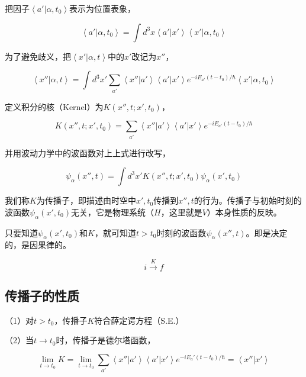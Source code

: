 把因子$\left\langle a' | \alpha, t_0 \right\rangle$表示为位置表象，

\begin{equation}
\left\langle a' | \alpha, t_0 \right\rangle = \int d^3 x \left\langle a' | x' \right\rangle \left\langle x' | \alpha, t_0 \right\rangle 
\end{equation}

为了避免歧义，把$\left\langle x' | \alpha, t \right\rangle$中的$x'$改记为$x''$，

\begin{equation}
\left\langle x'' | \alpha, t \right\rangle = \int d^3 x' \sum\limits_{a'}  \left\langle x'' | a' \right\rangle \left\langle a' | x' \right\rangle e^{- i E_{a'} (t - t_0) / \hbar} \left\langle x' | \alpha, t_0 \right\rangle
\end{equation}

定义积分的核（Kernel）为$K(x'', t; x', t_0)$，

\begin{equation}
K(x'', t; x', t_0) = \sum\limits_{a'}  \left\langle x'' | a' \right\rangle \left\langle a' | x' \right\rangle e^{- i E_{a'} (t - t_0) / \hbar}
\end{equation}

并用波动力学中的波函数对上上式进行改写，

\begin{equation}
\psi_\alpha (x'', t ) = \int d^3 x' K(x'', t; x', t_0) \psi_\alpha (x', t_0 )
\end{equation}

我们称$K$为传播子，即描述由时空中$x', t_0$传播到$x'', t$的行为。传播子与初始时刻的波函数$\psi_\alpha (x', t_0 )$无关，它是物理系统（$H$，这里就是$V$）本身性质的反映。

只要知道$\psi_\alpha (x', t_0 )$和$K$，就可知道$t > t_0$时刻的波函数$\psi_\alpha (x'', t )$。即是决定的，是因果律的。

\begin{equation*}
i \xrightarrow{K}{} f
\end{equation*}

\subsection{传播子的性质}

（1）对$t > t_0$，传播子$K$符合薛定谔方程（S.E.）

（2）当$t \to t_0$时，传播子是德尔塔函数，

\begin{equation}
\lim\limits_{t \to t_0} K = \lim\limits_{t \to t_0} \sum\limits_{a'} \left\langle x'' | a' \right\rangle \left\langle a' | x' \right\rangle e^{- i E_a' (t - t_0) / \hbar} = \left\langle x'' | x' \right\rangle
\end{equation}

